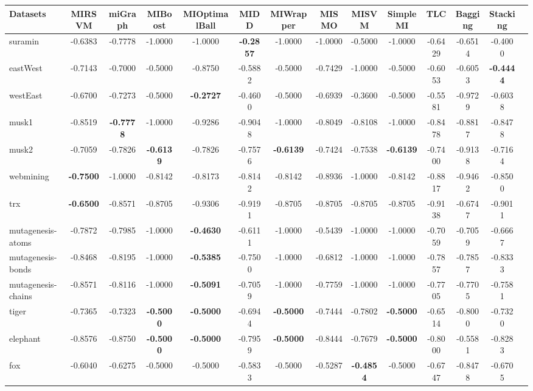 \begin{threeparttable}
\begin{tabular}{lccccccccccccc}
\toprule
Datasets &MIRSVM &miGraph &MIBoost &MIOptimalBall &MIDD &MIWrapper &MISMO &MISVM &SimpleMI &TLC &Bagging &Stacking \\
\midrule
suramin &-0.6383 &-0.7778 &-1.0000 &-1.0000 &\textbf{-0.2857} &-1.0000 &-1.0000 &-0.5000 &-1.0000 &-0.6429 &-0.6514 &-0.4000 &  \\
eastWest &-0.7143 &-0.7000 &-0.5000 &-0.8750 &-0.5882 &-0.5000 &-0.7429 &-1.0000 &-0.5000 &-0.6053 &-0.6053 &\textbf{-0.4444} &  \\
westEast &-0.6700 &-0.7273 &-0.5000 &\textbf{-0.2727} &-0.4600 &-0.5000 &-0.6939 &-0.3600 &-0.5000 &-0.5581 &-0.9729 &-0.6038 &  \\
musk1 &-0.8519 &\textbf{-0.7778} &-1.0000 &-0.9286 &-0.9048 &-1.0000 &-0.8049 &-0.8108 &-1.0000 &-0.8478 &-0.8817 &-0.8478 &  \\
musk2 &-0.7059 &-0.7826 &\textbf{-0.6139} &-0.7826 &-0.7576 &\textbf{-0.6139} &-0.7424 &-0.7538 &\textbf{-0.6139} &-0.7400 &-0.9138 &-0.7164 &  \\
webmining &\textbf{-0.7500} &-1.0000 &-0.8142 &-0.8173 &-0.8142 &-0.8142 &-0.8936 &-1.0000 &-0.8142 &-0.8817 &-0.9462 &-0.8500 &  \\
trx &\textbf{-0.6500} &-0.8571 &-0.8705 &-0.9306 &-0.9191 &-0.8705 &-0.8705 &-0.8705 &-0.8705 &-0.9138 &-0.6747 &-0.9011 &  \\
mutagenesis-atoms &-0.7872 &-0.7985 &-1.0000 &\textbf{-0.4630} &-0.6111 &-1.0000 &-0.5439 &-1.0000 &-1.0000 &-0.7059 &-0.7059 &-0.6667 &  \\
mutagenesis-bonds &-0.8468 &-0.8195 &-1.0000 &\textbf{-0.5385} &-0.7500 &-1.0000 &-0.6812 &-1.0000 &-1.0000 &-0.7857 &-0.7857 &-0.8333 &  \\
mutagenesis-chains &-0.8571 &-0.8116 &-1.0000 &\textbf{-0.5091} &-0.7059 &-1.0000 &-0.7759 &-1.0000 &-1.0000 &-0.7705 &-0.7705 &-0.7581 &  \\
tiger &-0.7365 &-0.7323 &\textbf{-0.5000} &\textbf{-0.5000} &-0.6944 &\textbf{-0.5000} &-0.7444 &-0.7802 &\textbf{-0.5000} &-0.6514 &-0.8000 &-0.7320 &  \\
elephant &-0.8576 &-0.8750 &\textbf{-0.5000} &\textbf{-0.5000} &-0.7959 &\textbf{-0.5000} &-0.8444 &-0.7679 &\textbf{-0.5000} &-0.8000 &-0.5581 &-0.8283 &  \\
fox &-0.6040 &-0.6275 &-0.5000 &-0.5000 &-0.5833 &-0.5000 &-0.5287 &\textbf{-0.4854} &-0.5000 &-0.6747 &-0.8478 &-0.6705 &  \\

\end{tabular}
\end{threeparttable}
